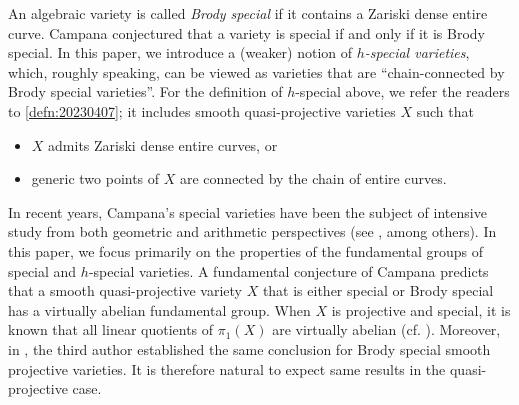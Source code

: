 \documentclass[11pt,english]{smfart}
\theoremstyle{plain}
\theoremstyle{definition}
\theoremstyle{remark}
\numberwithin{equation}{subsection}
\theoremstyle{plain}
\begin{document}

An algebraic variety is called \emph{Brody special} if it contains a Zariski dense entire curve. Campana conjectured \cite{Cam04,Cam11} that a variety is special if and only if it is Brody special. In this paper, we introduce a (weaker) notion of \emph{$h$-special varieties}, which, roughly speaking, can be viewed as varieties that are “chain-connected by Brody special varieties”.  For the definition of $h$-special above, we refer the readers to \cref{defn:20230407}; it includes smooth quasi-projective varieties $X$ such that
\begin{itemize}
	\item $X$ admits Zariski dense entire curves, or 
	\item generic two points of $X$ are connected by the chain of entire curves.
\end{itemize}   

In recent years, Campana’s special varieties have been the subject of intensive study from both geometric and arithmetic perspectives (see \cite{BCJW,BJL24,BJR,JR22}, among others). In this paper, we focus primarily on the properties of the fundamental groups of special and $h$-special varieties. A fundamental conjecture of Campana \cite[Conjecture 13.10.(1)]{Cam11} predicts that a smooth quasi-projective variety $X$ that is either special or Brody special has a virtually abelian fundamental group. When $X$ is projective and special, it is known that all linear quotients of $\pi_1(X)$ are virtually abelian (cf. \cite[Theorem 7.8]{Cam04}). Moreover, in \cite[Theorem 1.1]{Yam10}, the third author established the same conclusion for Brody special smooth projective varieties. It is therefore natural to expect same  results in the quasi-projective case.
\end{document}
